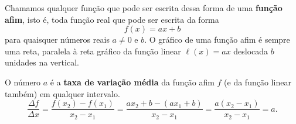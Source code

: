 \begin{observation}{}
Chamamos qualquer função que pode ser escrita dessa forma de uma \textbf{função afim}, isto é, toda função real que pode ser escrita da forma
\[
f(x)=ax+b
\]
para quaisquer números reais $ a\neq 0 $ e $ b$. O gráfico de uma função afim é sempre uma reta, paralela à reta gráfico da função linear $ \ell(x)=ax $ deslocada $b$ unidades na vertical.

O número $ a $ é a \textbf{taxa de variação média} da função afim $ f $ (e da função linear também) em qualquer intervalo.
\[
\dfrac{\Delta f}{\Delta x}= \dfrac{f(x_2)-f(x_1)}{x_2-x_1}= \dfrac{ax_2+b-(ax_1+b)}{x_2-x_1}= \dfrac{a(x_2-x_1)}{x_2-x_1}=a.
\]


\begin{figure}[H]
\centering


\end{figure}

\end{observation}

